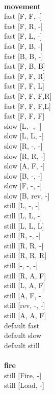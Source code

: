 \ \\ {\bf movement } \\
fast [F, F, -] \\
fast [F, R, -] \\
fast [F, L, -] \\
fast [F, B, -] \\
fast [B, B, -] \\
fast [F, B, B] \\
fast [F, F, R] \\
fast [F, F, L] \\
fast [F, F, F,R] \\
fast [F, F, F,L] \\
fast [F, F, F] \\
slow [L, -, -] \\
slow [L, L, -] \\
slow [R, -, -] \\
slow [R, R, -] \\
slow [A, F, -] \\
slow [B, -, -] \\
slow [F, -, -] \\
slow [B, rev, -] \\
still [L, -, -] \\
still [L, L, -] \\
still [L, L, L] \\
still [R, -, -] \\
still [R, R, -] \\
still [R, R, R] \\
still [-, -, -] \\
still [R, A, F] \\
still [L, A, F] \\
still [A, F, -] \\
still [rev, -, -] \\
still [A, A, F] \\
default fast \\
default slow \\
default still \\
\ \\ {\bf fire } \\
still [Fire, -] \\
still [Load, -] \\


